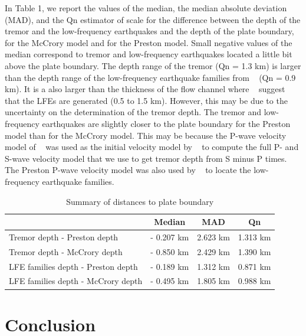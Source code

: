\documentclass[draft]{agujournal2019}
\begin{document}
In Table 1, we report the values of the median, the median absolute deviation (MAD), and the Qn estimator of scale for the difference between the depth of the tremor and the low-frequency earthquakes and the depth of the plate boundary, for the McCrory model and for the Preston model. Small negative values of the median correspond to tremor and low-frequency earthquakes located a little bit above the plate boundary. The depth range of the tremor (Qn = 1.3 km) is larger than the depth range of the low-frequency earthquake families from ~ (Qn = 0.9 km). It is a also larger than the thickness of the flow channel where ~ suggest that the LFEs are generated (0.5 to 1.5 km). However, this may be due to the uncertainty on the determination of the tremor depth. The tremor and low-frequency earthquakes are slightly closer to the plate boundary for the Preston model than for the McCrory model. This may be because the P-wave velocity model of ~ was used as the initial velocity model by ~ to compute the full P- and S-wave velocity model that we use to get tremor depth from S minus P times. The Preston P-wave velocity model was also used by ~ to locate the low-frequency earthquake families. \\

\begin{table}
\caption{Summary of distances to plate boundary}
\centering
\begin{tabular}{l c c c}
\hline
 & Median & MAD & Qn \\ 
\hline
Tremor depth - Preston depth & - 0.207 km & 2.623 km & 1.313 km \\
Tremor depth - McCrory depth & - 0.850 km & 2.429 km & 1.390 km \\
LFE families depth - Preston depth & - 0.189 km & 1.312 km & 0.871 km \\
LFE families depth - McCrory depth & - 0.495 km & 1.805 km & 0.988 km \\
\hline
\end{tabular}
\end{table}

\section{Conclusion}
\end{document}
